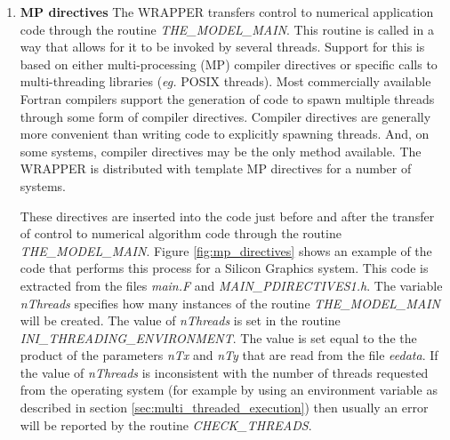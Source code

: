 \begin{enumerate}
\item {\bf MP directives}
  The WRAPPER transfers control to numerical application code through
  the routine {\em THE\_MODEL\_MAIN}. This routine is called in a way
  that allows for it to be invoked by several threads. Support for
  this is based on either multi-processing (MP) compiler directives or
  specific calls to multi-threading libraries (\textit{eg.} POSIX
  threads).  Most commercially available Fortran compilers support the
  generation of code to spawn multiple threads through some form of
  compiler directives.  Compiler directives are generally more
  convenient than writing code to explicitly spawning threads.  And,
  on some systems, compiler directives may be the only method
  available.  The WRAPPER is distributed with template MP directives
  for a number of systems.

  These directives are inserted into the code just before and after
  the transfer of control to numerical algorithm code through the
  routine {\em THE\_MODEL\_MAIN}. Figure \ref{fig:mp_directives} shows
  an example of the code that performs this process for a Silicon
  Graphics system.  This code is extracted from the files {\em main.F}
  and {\em MAIN\_PDIRECTIVES1.h}. The variable {\em nThreads}
  specifies how many instances of the routine {\em THE\_MODEL\_MAIN}
  will be created. The value of {\em nThreads} is set in the routine
  {\em INI\_THREADING\_ENVIRONMENT}. The value is set equal to the the
  product of the parameters {\em nTx} and {\em nTy} that are read from
  the file {\em eedata}. If the value of {\em nThreads} is
  inconsistent with the number of threads requested from the operating
  system (for example by using an environment variable as described in
  section \ref{sec:multi_threaded_execution}) then usually an error
  will be reported by the routine {\em CHECK\_THREADS}.



\end{enumerate}
